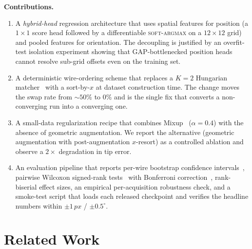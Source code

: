 \documentclass[conference,10pt,letterpaper]{IEEEtran}
\newcommand{\softargmax}{\textsc{soft-argmax}}
\newcommand{\px}{\,px}
\begin{document}
\noindent
\textbf{Contributions.}
\begin{enumerate}
  \item A \emph{hybrid-head} regression architecture that uses
        spatial features for position (a $1{\times}1$ score head followed
        by a differentiable \softargmax{} on a $12{\times}12$ grid) and
        pooled features for orientation. The decoupling is justified by
        an overfit-test isolation experiment showing that GAP-bottlenecked
        position heads cannot resolve sub-grid offsets even on the
        training set.
  \item A deterministic wire-ordering scheme that replaces a $K{=}2$
        Hungarian matcher~\cite{kuhn1955} with a sort-by-$x$ at dataset
        construction time. The change moves the swap rate from
        $\sim 50\%$ to $0\%$ and is the single fix that converts a
        non-converging run into a converging one.
  \item A small-data regularization recipe that combines
        Mixup~\cite{zhang2018mixup} ($\alpha\!=\!0.4$) with the absence
        of geometric augmentation. We report the alternative
        (geometric augmentation with post-augmentation $x$-resort)
        as a controlled ablation and observe a $2{\times}$ degradation
        in tip error.
  \item An evaluation pipeline that reports per-wire bootstrap confidence
        intervals~\cite{efron1993}, pairwise Wilcoxon signed-rank
        tests~\cite{wilcoxon1945} with Bonferroni
        correction~\cite{dunn1961}, rank-biserial effect sizes, an
        empirical per-acquisition robustness check, and a smoke-test
        script that loads each released checkpoint and verifies the
        headline numbers within $\pm 1\px$ / $\pm 0.5^\circ$.
\end{enumerate}

\section{Related Work}
\label{sec:related}
\end{document}
